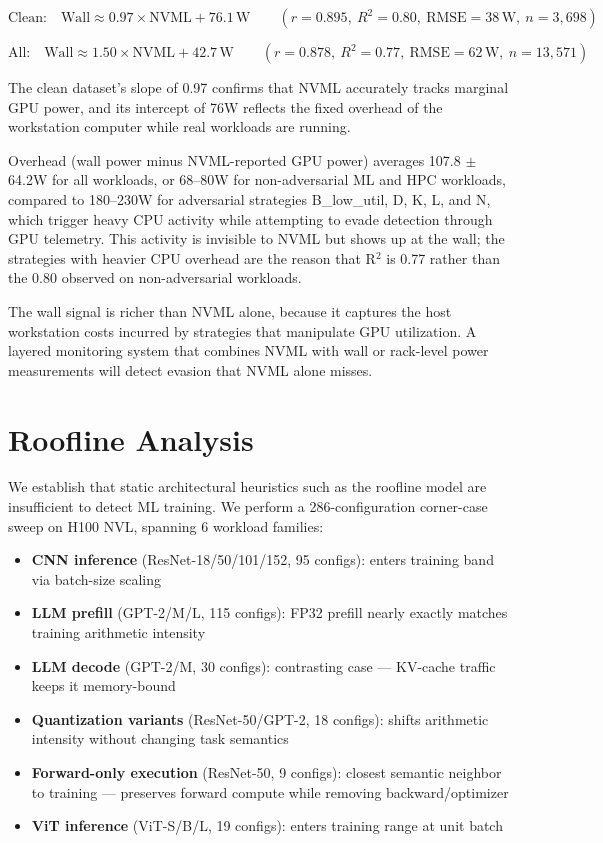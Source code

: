 \[\text{Clean:}\quad \text{Wall} \approx 0.97 \times \text{NVML} + 76.1\,\text{W}\qquad (r=0.895,\ R^2=0.80,\ \text{RMSE}=38\,\text{W},\ n=3{,}698)\]

\[\text{All:}\quad \text{Wall} \approx 1.50 \times \text{NVML} + 42.7\,\text{W}\qquad (r=0.878,\ R^2=0.77,\ \text{RMSE}=62\,\text{W},\ n=13{,}571)\]

The clean dataset's slope of 0.97 confirms that NVML accurately tracks marginal GPU power, and its intercept of 76W reflects the fixed overhead of the workstation computer while real workloads are running.

Overhead (wall power minus NVML-reported GPU power) averages 107.8 $\pm$ 64.2W for all workloads, or 68--80W for non-adversarial ML and HPC workloads, compared to 180--230W for adversarial strategies B\_low\_util, D, K, L, and N, which trigger heavy CPU activity while attempting to evade detection through GPU telemetry. This activity is invisible to NVML but shows up at the wall; the strategies with heavier CPU overhead are the reason that R$^2$ is 0.77 rather than the 0.80 observed on non-adversarial workloads.

The wall signal is richer than NVML alone, because it captures the host workstation costs incurred by strategies that manipulate GPU utilization. A layered monitoring system that combines NVML with wall or rack-level power measurements will detect evasion that NVML alone misses.

\FloatBarrier
\section{Roofline Analysis}

We establish that static architectural heuristics such as the roofline model \citep{williams2009} are insufficient to detect ML training. We perform a 286-configuration corner-case sweep on H100 NVL, spanning 6 workload families:

\begin{itemize}\itemsep2pt
  \item \textbf{CNN inference} (ResNet-18/50/101/152, 95 configs): enters training band via batch-size scaling
  \item \textbf{LLM prefill} (GPT-2/M/L, 115 configs): FP32 prefill nearly exactly matches training arithmetic intensity
  \item \textbf{LLM decode} (GPT-2/M, 30 configs): contrasting case --- KV-cache traffic keeps it memory-bound
  \item \textbf{Quantization variants} (ResNet-50/GPT-2, 18 configs): shifts arithmetic intensity without changing task semantics
  \item \textbf{Forward-only execution} (ResNet-50, 9 configs): closest semantic neighbor to training --- preserves forward compute while removing backward/optimizer
  \item \textbf{ViT inference} (ViT-S/B/L, 19 configs): enters training range at unit batch
\end{itemize}

